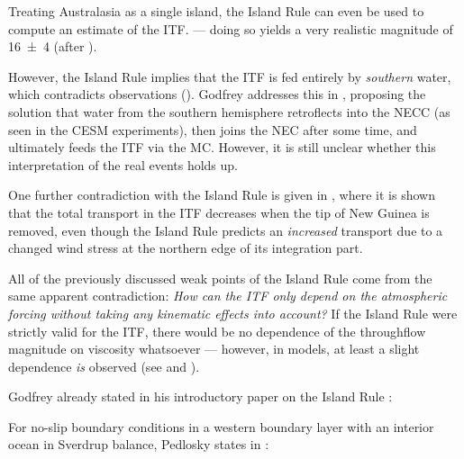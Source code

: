Treating Australasia as a single island, the Island Rule can even be used to compute an estimate of the \ac{ITF}. --- doing so yields a very realistic magnitude of \SI{16(4)}{\sv} (after \cite{godfrey}).

However, the Island Rule implies that the \ac{ITF} is fed entirely by \emph{southern} water, which contradicts observations (\cf {}). Godfrey addresses this in \cite{godfreyind}, proposing the solution that water from the southern hemisphere retroflects into the \ac{NECC} (as seen in the \ac{CESM} experiments), then joins the \ac{NEC} after some time, and ultimately feeds the \ac{ITF} via the \ac{MC}. However, it is still unclear whether this interpretation of the real events holds up.

One further contradiction with the Island Rule is given in \cite{jochumind}, where it is shown that the total transport in the \ac{ITF} decreases when the tip of New Guinea is removed, even though the Island Rule predicts an \emph{increased} transport due to a changed wind stress at the northern edge of its integration part.

All of the previously discussed weak points of the Island Rule come from the same apparent contradiction: \textsl{How can the \ac{ITF} only depend on the atmospheric forcing without taking any kinematic effects into account?} If the Island Rule were strictly valid for the \ac{ITF}, there would be no dependence of the throughflow magnitude on viscosity whatsoever --- however, in models, at least a slight dependence \emph{is} observed (see  and \eg \cite{jochumind}).

Godfrey already stated in his introductory paper on the Island Rule \citep{godfrey}:


For no-slip boundary conditions in a western boundary layer with an interior ocean in Sverdrup balance, Pedlosky states in :

